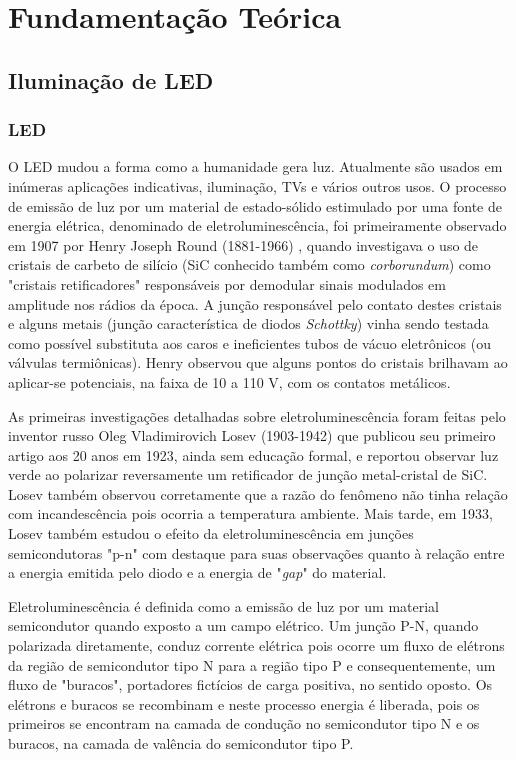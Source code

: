 \chapter{Fundamentação Teórica}

\section{Iluminação de LED}

\subsection{LED}

O \acf{LED} mudou a forma como a humanidade gera luz. Atualmente são usados em inúmeras aplicações indicativas, iluminação, TVs e vários outros usos. O processo de emissão de luz por um material de estado-sólido estimulado por uma fonte de energia elétrica, denominado de eletroluminescência, foi primeiramente observado em 1907 por Henry Joseph Round (1881-1966) \cite{led}, quando investigava o uso de cristais de carbeto de silício (SiC conhecido também como \textit{corborundum}) como "cristais retificadores" responsáveis por demodular sinais modulados em amplitude nos rádios da época. A junção responsável pelo contato destes cristais e alguns metais (junção característica de diodos \textit{Schottky}) vinha sendo testada como possível substituta aos caros e ineficientes tubos de vácuo eletrônicos (ou válvulas termiônicas). Henry observou que alguns pontos do cristais brilhavam ao aplicar-se potenciais, na faixa de 10 a 110 V, com os contatos metálicos.

As primeiras investigações detalhadas sobre eletroluminescência foram feitas pelo inventor russo Oleg Vladimirovich Losev (1903-1942) que publicou seu primeiro artigo aos 20 anos em 1923, ainda sem educação formal, e reportou observar luz verde ao polarizar reversamente um retificador de junção metal-cristal de SiC. Losev também observou corretamente que a razão do fenômeno não tinha relação com incandescência pois ocorria a temperatura ambiente. Mais tarde, em 1933, Losev também estudou o efeito da eletroluminescência em junções semicondutoras "p-n" com destaque para suas observações quanto à relação entre a energia emitida pelo diodo e a energia de "\textit{gap}" do material.

Eletroluminescência é definida como a emissão de luz por um material semicondutor quando exposto a um campo elétrico. Um junção P-N, quando polarizada diretamente, conduz corrente elétrica pois ocorre um fluxo de elétrons da região de semicondutor tipo N para a região tipo P e consequentemente, um fluxo de "buracos", portadores fictícios de carga positiva, no sentido oposto. Os elétrons e buracos se recombinam e neste processo energia é liberada, pois os primeiros se encontram na camada de condução no semicondutor tipo N e os buracos, na camada de valência do semicondutor tipo P.

